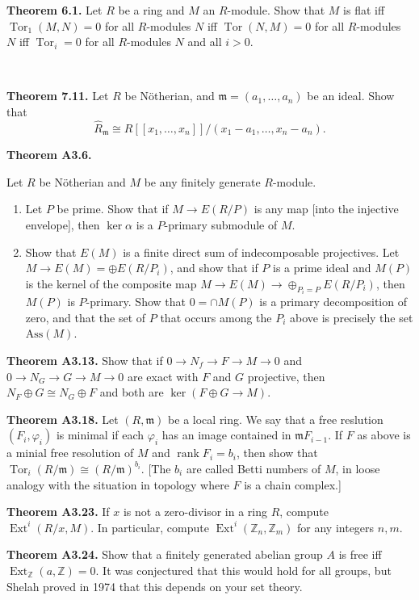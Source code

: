 \documentclass[Letter,12pt]{article}
\newcommand{\problem}[2]{
	\vspace{0.3in} 
	\begin{leftbar} 
		\noindent \textbf{{#1}.} {#2} 
\end{leftbar} }
\renewenvironment{leftbar}{%
	\def\FrameCommand{\vrule width 1pt \relax\hspace {5pt}}
	\MakeFramed {\advance \hsize -\width \FrameRestore }
}{
	\endMakeFramed
}
\newcommand{\z}{\mathbb{Z}}
\renewcommand{\a}{\alpha}
\DeclareMathOperator{\rank}{rank}
\newcommand{\<}{\left\langle}
\renewcommand{\>}{\right\rangle}
\newcommand{\is}{\cong}
\DeclareMathOperator{\Ext}{Ext}
\DeclareMathOperator{\Tor}{Tor}
\newcommand{\maxl}{\mathfrak m}
\theoremstyle{definition}
\newcommand{\ddi}[1]{\todo[inline]{#1}~}
\begin{document}
	
	
	\problem{Theorem 6.1}{
		Let $R$ be a ring and $M$ an $R$-module. Show that $M$ is flat iff $\Tor_1(M,N)=0$ for all $R$-modules $N$ iff $\Tor(N,M)=0$ for all $R$-modules $N$ iff $\Tor_i=0$ for all $R$-modules $N$ and all $i>0$.
	}\ddi{David Comment}
	
	
	
	\problem{Theorem 7.11}{
		Let $R$ be N\"otherian, and $\maxl = (a_1,\dots, a_n)$ be an ideal. Show that
		$$\hat{R}_\maxl \is R[[x_1,\dots, x_n]]/(x_1-a_1,\dots, x_n-a_n).$$
	}
	
	
	
	\problem{Theorem A3.6}{
		Let $R$ be N\"otherian and $M$ be any finitely generate $R$-module.
		\begin{enumerate}
			\item Let $P$ be prime. Show that if $M\to E(R/P)$ is any map [into the injective envelope], then $\ker\a$ is a $P$-primary submodule of $M$.
			\item Show that $E(M)$ is a finite direct sum of indecomposable projectives. Let $M\to E(M)=\oplus E(R/P_i)$, and show that if $P$ is a prime ideal and $M(P)$ is the kernel of the composite map $M\to E(M)\to \oplus_{P_i=P} E(R/P_i)$, then $M(P)$ is $P$-primary. Show that $0=\cap M(P)$ is a primary decomposition of zero, and that the set of $P$ that occurs among the $P_i$ above is precisely the set $\text{Ass}(M)$.
		\end{enumerate}
	}
	
	
	\problem{Theorem A3.13}{
		Show that if $0\to N_f\to F\to M\to 0$ and $0\to N_G\to G\to M\to 0$ are exact with $F$ and $G$ projective, then $N_F\oplus G \is N_G\oplus F$ and both are $\ker(F\oplus G\to M)$.
	}
	
	
	\problem{Theorem A3.18}{
		Let $(R,\maxl)$ be a local ring. We say that a free reslution $(F_i, \varphi_i)$ is minimal if each $\varphi_i$ has an image contained in $\maxl F_{i-1}$.  If $F$ as above is a minial free resolution of $M$ and $\rank F_i=b_i$, then show that $\Tor_i(R/\maxl)\is (R/\maxl)^{b_i}$. [The $b_i$ are called Betti numbers of $M$, in loose analogy with the situation in topology where $F$ is a chain complex.]
	}
	
	
	\problem{Theorem A3.23}{
		If $x$ is not a zero-divisor in a ring $R$, compute $\Ext^i(R/x,M)$. In particular, compute $\Ext^i(\z_n,\z_m)$ for any integers $n,m$.
	}
	
	
	\problem{Theorem A3.24}{
		Show that a finitely generated abelian group $A$ is free iff $\Ext_\z(a,\z)=0$. It was conjectured that this would hold for all groups, but Shelah proved in 1974 that this depends on your set theory.
	}
	
	
	
	
\end{document}
